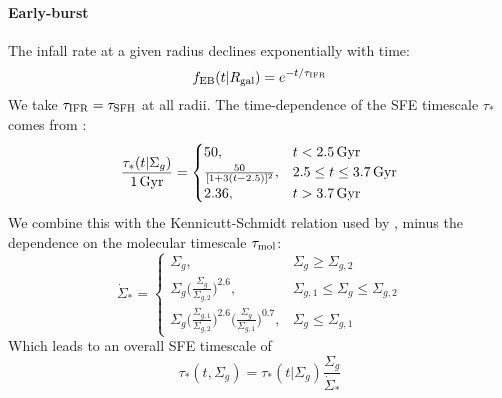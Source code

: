 \documentclass[twocolumn,linenumbers,twocolappendix]{aastex631}
\begin{document}
\paragraph{Early-burst} The infall rate at a given radius declines exponentially with time:
\begin{equation}
    f_{\rm EB}(t|R_{\rm gal}) = e^{-t/\tau_{\rm IFR}}
    \label{eq:earlyburst-ifr}
\end{equation}
We take $\tau_{\rm IFR} = \tau_{\rm SFH}$ at all radii.
The time-dependence of the SFE timescale $\tau_*$ comes from \citet{Conroy2022-ThickDisk}:
\begin{equation}
    \frac{\tau_*(t|\Sigma_g)}{1\,\rm{Gyr}} =
    \begin{cases}
        50, & t < 2.5\,\rm{Gyr} \\
        \frac{50}{[1+3(t-2.5)]^2}, & 2.5\leq t \leq 3.7\,\rm{Gyr} \\
        2.36, & t > 3.7\,\rm{Gyr}
    \end{cases}
    \label{eq:earlyburst-conroy22}
\end{equation}
We combine this with the Kennicutt-Schmidt relation used by \citet{Johnson2021-Migration}, minus the dependence on the molecular timescale $\tau_{\rm mol}$:
\begin{equation}
    \dot \Sigma_* = 
    \begin{cases}
        \Sigma_g, & \Sigma_g \geq \Sigma_{g,2} \\
        \Sigma_g \Big(\frac{\Sigma_g}{\Sigma_{g,2}}\Big)^{2.6}, & \Sigma_{g,1} \leq \Sigma_g \leq \Sigma_{g,2} \\
        \Sigma_g \Big(\frac{\Sigma_{g,1}}{\Sigma_{g,2}}\Big)^{2.6} \Big(\frac{\Sigma_g}{\Sigma_{g,1}}\Big)^{0.7}, & \Sigma_g \leq \Sigma_{g,1}
    \end{cases}
    \label{eq:kennicutt-schmidt}
\end{equation}
Which leads to an overall SFE timescale of
\begin{equation}
    \tau_*(t,\Sigma_g) = \tau_*(t|\Sigma_g) \frac{\Sigma_g}{\dot \Sigma_*}
    \label{eq:earlyburst-taustar}
\end{equation}
\end{document}
